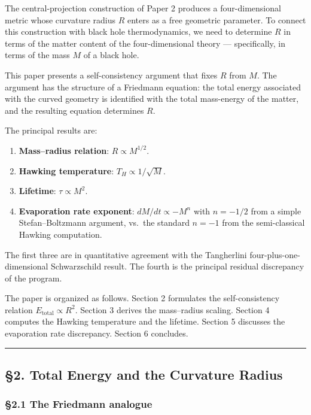 \documentclass[a4paper,11pt]{article}
\theoremstyle{definition}
\providecommand{\tightlist}{\setlength{\itemsep}{0pt}\setlength{\parskip}{0pt}}
\begin{document}
The central-projection construction of Paper 2 produces a
four-dimensional metric whose curvature radius \(R\) enters as a free
geometric parameter. To connect this construction with black hole
thermodynamics, we need to determine \(R\) in terms of the matter
content of the four-dimensional theory --- specifically, in terms of the
mass \(M\) of a black hole.

This paper presents a self-consistency argument that fixes \(R\) from
\(M\). The argument has the structure of a Friedmann equation: the total
energy associated with the curved geometry is identified with the total
mass-energy of the matter, and the resulting equation determines \(R\).

The principal results are:

\begin{enumerate}
\def\labelenumi{\arabic{enumi}.}
\tightlist
\item
  \textbf{Mass--radius relation}: \(R \propto M^{1/2}\).
\item
  \textbf{Hawking temperature}: \(T_H \propto 1/\sqrt{M}\).
\item
  \textbf{Lifetime}: \(\tau \propto M^2\).
\item
  \textbf{Evaporation rate exponent}: \(dM/dt \propto -M^{n}\) with
  \(n = -1/2\) from a simple Stefan--Boltzmann argument, vs.~the
  standard \(n = -1\) from the semi-classical Hawking computation.
\end{enumerate}

The first three are in quantitative agreement with the Tangherlini
four-plus-one-dimensional Schwarzschild result. The fourth is the
principal residual discrepancy of the program.

The paper is organized as follows. Section 2 formulates the
self-consistency relation \(E_{\mathrm{total}} \propto R^2\). Section 3
derives the mass--radius scaling. Section 4 computes the Hawking
temperature and the lifetime. Section 5 discusses the evaporation rate
discrepancy. Section 6 concludes.

\begin{center}\rule{0.5\linewidth}{0.5pt}\end{center}

\subsection{§2. Total Energy and the Curvature
Radius}\label{total-energy-and-the-curvature-radius}

\subsubsection{§2.1 The Friedmann
analogue}\label{the-friedmann-analogue}
\end{document}
